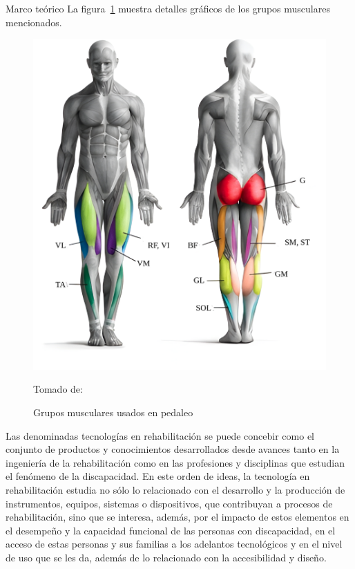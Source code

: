 \begin{thesischapter}{1} {Marco teórico}
    \vspace{10pt}
    La figura~\ref{fig: musculegroups} muestra detalles gráficos de los grupos musculares mencionados.
    \begin{figure}[ht]
        \centering
        \includegraphics[scale=0.2]{images/musculegroups.png}
        \caption{Grupos musculares usados en pedaleo}
        Tomado de: ~\cite{Quémúsc72}
        \label{fig: musculegroups}
    \end{figure}

    \vspace{10pt}
    Las denominadas tecnologías en rehabilitación se puede concebir como el conjunto de productos y conocimientos
    desarrollados desde avances tanto en la ingeniería de la rehabilitación como en las profesiones y disciplinas 
    que estudian el fenómeno de la discapacidad. En este orden de ideas, la tecnología en rehabilitación estudia 
    no sólo lo relacionado con el desarrollo y la producción de instrumentos, equipos, sistemas o dispositivos, 
    que contribuyan a procesos de rehabilitación, sino que se interesa, además, por el impacto de estos elementos en el desempeño y la capacidad funcional de las personas con discapacidad, en el acceso
    de estas personas y sus familias a los adelantos tecnológicos y en el nivel de uso que se les da,
    además de lo relacionado con la accesibilidad y diseño.\cite{matheus1990tecnologia}


\end{thesischapter}
